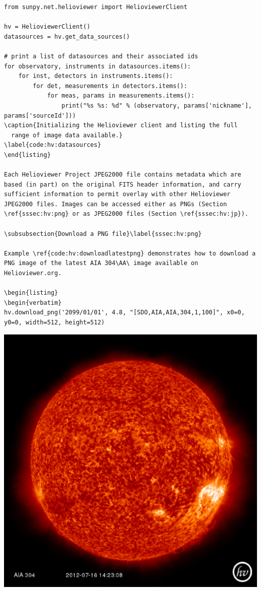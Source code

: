 \begin{listing}
\begin{verbatim}
from sunpy.net.helioviewer import HelioviewerClient

hv = HelioviewerClient()
datasources = hv.get_data_sources()

# print a list of datasources and their associated ids
for observatory, instruments in datasources.items():
    for inst, detectors in instruments.items():
        for det, measurements in detectors.items():
            for meas, params in measurements.items():
                print("%s %s: %d" % (observatory, params['nickname'], params['sourceId']))
\caption{Initializing the Helioviewer client and listing the full
  range of image data available.}
\label{code:hv:datasources}
\end{listing}

Each Helioviewer Project JPEG2000 file contains metadata which are
based (in part) on the original FITS header information, and carry
sufficient information to permit overlay with other Helioviewer
JPEG2000 files. Images can be accessed either as PNGs (Section
\ref{sssec:hv:png} or as JPEG2000 files (Section \ref{sssec:hv:jp}).

\subsubsection{Download a PNG file}\label{sssec:hv:png}

Example \ref{code:hv:downloadlatestpng} demonstrates how to download a
PNG image of the latest AIA 304\AA\ image available on
Helioviewer.org.

\begin{listing}
\begin{verbatim}
hv.download_png('2099/01/01', 4.8, "[SDO,AIA,AIA,304,1,100]", x0=0, y0=0, width=512, height=512)
\end{verbatim}
\includegraphics[width=0.8\columnwidth]{helioviewer_latest_aia_304.eps}
\caption{Acquisition of a PNG file showing the latest AIA 304\AA\ image available at
  www.helioviewer.org.}
\label{code:hv:downloadlatestpng}
\end{listing}


